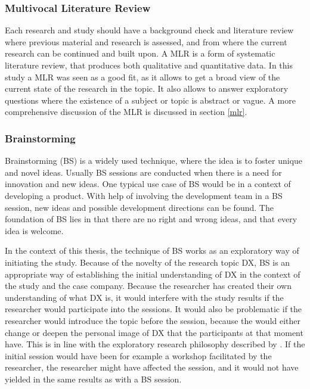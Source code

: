 \documentclass[english, 12pt, a4paper, sci, utf8, a-1b, online]{aaltothesis}
\begin{document}
\subsubsection{Multivocal Literature Review}

Each research and study should have a background check and literature review where previous material and research is assessed, and from where the current research can be continued and built upon. A MLR is a form of systematic literature review, that produces both qualitative and quantitative data. In this study a MLR was seen as a good fit, as it allows to get a broad view of the current state of the research in the topic. It also allows to answer exploratory questions where the existence of a subject or topic is abstract or vague. A more comprehensive discussion of the MLR is discussed in section \ref{mlr}.


\subsubsection{Brainstorming}

Brainstorming (BS) is a widely used technique, where the idea is to foster unique and novel ideas. Usually BS sessions are conducted when there is a need for innovation and new ideas. One typical use case of BS would be in a context of developing a product. With help of involving the development team in a BS session, new ideas and possible development directions can be found. The foundation of BS lies in that there are no right and wrong ideas, and that every idea is welcome.

In the context of this thesis, the technique of BS works as an exploratory way of initiating the study. Because of the novelty of the research topic DX, BS is an appropriate way of establishing the initial understanding of DX in the context of the study and the case company. Because the researcher has created their own understanding of what DX is, it would interfere with the study results if the researcher would participate into the sessions. It would also be problematic if the researcher would introduce the topic before the session, because the would either change or deepen the personal image of DX that the participants at that moment have. This is in line with the exploratory research philosophy described by \textcite{ethnographically-informed}. If the initial session would have been for example a workshop facilitated by the researcher, the researcher might have affected the session, and it would not have yielded in the same results as with a BS session.
\end{document}
